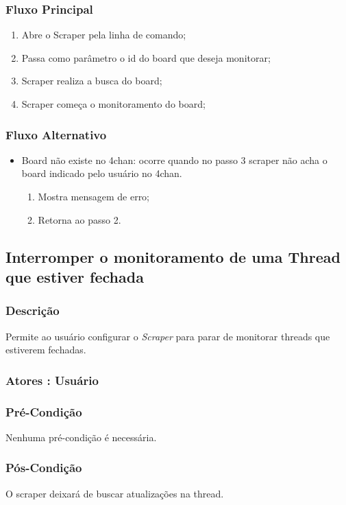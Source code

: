 \subsubsection{Fluxo Principal}
\begin{enumerate}
    \item Abre o Scraper pela linha de comando;
    \item Passa como parâmetro o id do board que deseja monitorar;
    \item Scraper realiza a busca do board;
    \item Scraper começa o monitoramento do board;
\end{enumerate}
\subsubsection{Fluxo Alternativo}
\begin{itemize}
    \item Board não existe no 4chan: ocorre quando no passo 3 scraper não acha o board indicado pelo usuário no 4chan.
    \begin{enumerate}
        \item Mostra mensagem de erro;
        \item Retorna ao passo 2.
    \end{enumerate}
\end{itemize}


\subsection{Interromper o monitoramento de uma Thread que estiver fechada}
\subsubsection{Descrição}
Permite ao usuário configurar o \textit{Scraper} para parar de monitorar threads que estiverem fechadas.
\subsubsection{Atores : Usuário}
\subsubsection{Pré-Condição}
Nenhuma pré-condição é necessária.
\subsubsection{Pós-Condição}
O scraper deixará de buscar atualizações na thread.

